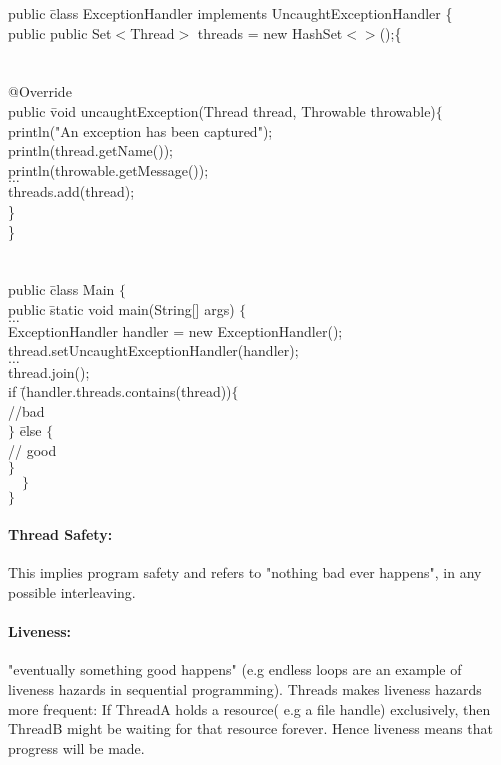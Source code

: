 \documentclass[8pt]{extreport}
\begin{document}
\begin{snugshade*}
\begin{tabbing}
public \=class ExceptionHandler implements UncaughtExceptionHandler \{ \\
\> public public Set$<$Thread$>$ threads = new HashSet$<>$();\{\\
\\
\\
@Override\\
public \= void uncaughtException(Thread thread, Throwable throwable)$\{$\\
\>println("An exception has been captured");\\
\> println(thread.getName());\\
\> println(throwable.getMessage());\\
\> $\dots$\\
\> threads.add(thread);\\
\> \} \\
\} \\
\\
\\
public \= class Main $\{$\\
\> public \= static void main(String[] args) $\{$\\
\>$\dots$\\
\> ExceptionHandler handler = new ExceptionHandler();\\
\> thread.setUncaughtExceptionHandler(handler);\\
\>$\dots$\\
\>thread.join();\\
\>if  \=(handler.threads.contains(thread))$\{$ \\
\>\> //bad \\
\> $\}$ \= else  $\{$ \\
\>\> // good \\
\> $\}$\\
 $\quad \}$\\
$\}$\\

\end{tabbing}
\end{snugshade*}
\paragraph{Thread Safety:} This implies program safety and refers to "nothing bad ever happens", in any possible interleaving.
\paragraph{Liveness:} "eventually something good happens" (e.g endless loops are an example of liveness hazards in sequential programming). Threads makes liveness hazards more frequent: If ThreadA holds a resource( e.g a file handle) exclusively, then ThreadB might be waiting for that resource forever. Hence liveness means that progress will be made.
\end{document}
